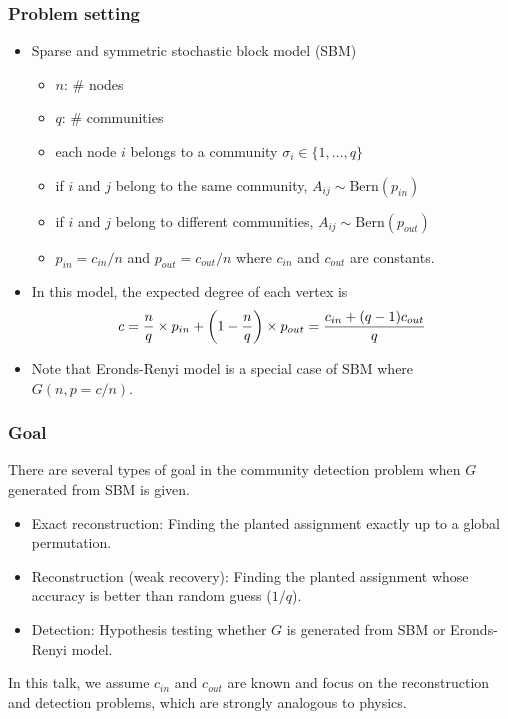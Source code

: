 \documentclass[dvipdfmx,11pt]{beamer}
\begin{document}
\begin{frame}
  \frametitle{Problem setting}
  \begin{itemize}
    \item Sparse and symmetric stochastic block model (SBM)
    \begin{itemize}
      \item $n$:  $\#$ nodes
      \item $q$:  $\#$ communities
      \item each node $i$ belongs to a community $\sigma_i \in \{1, \dots, q\}$
      \item if $i$ and $j$ belong to the same community, $A_{ij} \sim \text{Bern}(p_{in})$
      \item if $i$ and $j$ belong to different communities, $A_{ij} \sim \text{Bern}(p_{out})$
      \item $p_{in} = c_{in} / n$ and $p_{out} = c_{out} / n$ where $c_{in}$ and $c_{out}$ are constants.
    \end{itemize}
    \item In this model, the expected degree of each vertex is 
    \begin{align}
      c = \frac{n}{q} \times {p_{in}} + \qty(1-\frac{n}{q})\times{p_{out}} = \frac{c_{in} + (q-1) c_{out}}{q}
    \end{align}
    \item Note that Eronds-Renyi model is a special case of SBM where $G(n, p=c/n)$.
\end{itemize}
\end{frame}

\begin{frame}
  \frametitle{Goal}
  There are several types of goal in the community detection problem when $G$ generated from SBM is given.
  \begin{itemize}
    \item \alert{Exact reconstruction}: Finding the planted assignment exactly up to a global permutation.
    \item \alert{Reconstruction (weak recovery)}: Finding the planted assignment whose accuracy is better than random guess ($1/q$).
    \item \alert{Detection}: Hypothesis testing whether $G$ is generated from SBM or Eronds-Renyi model.
  \end{itemize}
  In this talk, we assume $c_{in}$ and $c_{out}$ are known and focus on the reconstruction and detection problems, which are strongly analogous to physics.
\end{frame}
\end{document}
